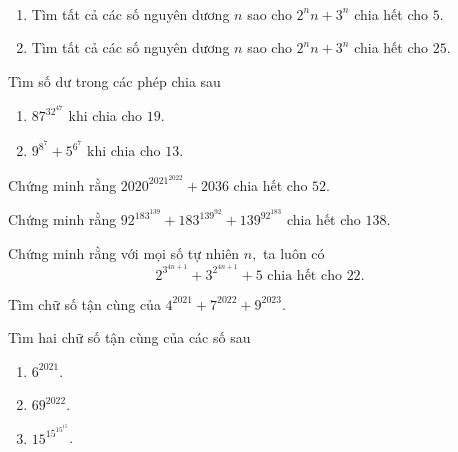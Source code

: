 \begin{btt}\
\begin{enumerate}[a,] 
    \item Tìm tất cả các số nguyên dương $n$ sao cho $2^{n}n+3^{n}$ chia hết cho $5.$
    \item Tìm tất cả các số nguyên dương $n$ sao cho $2^{n}n+3^{n}$ chia hết cho $25.$
\end{enumerate} 
\end{btt}

\begin{btt}
Tìm số dư trong các phép chia sau
\begin{multicols}{2}
\begin{enumerate}[a,]
    \item $87^{32^{47}}$ khi chia cho $19$.
    \item $9^{8^7} + 5^{6^7}$ khi chia cho $13$.
\end{enumerate}
\end{multicols}
\end{btt}

\begin{btt}
Chứng minh rằng $2020^{2021^{2022}} + 2036$ chia hết cho $52$.
\end{btt}

\begin{btt}
Chứng minh rằng $92^{183^{139}} + 183^{139^{92}} + 139^{92^{183}}$ chia hết cho $138$.
\end{btt}

\begin{btt}
Chứng minh rằng với mọi số tự nhiên $n,$ ta luôn có
\[2^{3^{4n+1}}+3^{2^{4n+1}}+5\text{ chia hết cho }22.\]
\end{btt}

\begin{btt}
Tìm chữ số tận cùng của $4^{2021} + 7^{2022} + 9^{2023}.$
\end{btt}

\begin{btt}
Tìm hai chữ số tận cùng của các số sau
\begin{multicols}{3}
    \begin{enumerate}[a,]
    \item $6^{2021}$.
    \item $69^{2022}.$
    \item $15^{15^{15^{15}}}$.
\end{enumerate}
\end{multicols}
\end{btt}


